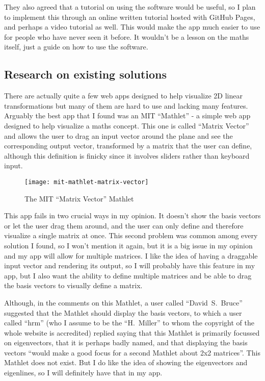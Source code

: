 \documentclass[../main.tex]{subfiles}
\begin{document}
They also agreed that a tutorial on using the software would be useful, so I plan to implement this through an online written tutorial hosted with GitHub Pages, and perhaps a video tutorial as well. This would make the app much easier to use for people who have never seen it before. It wouldn't be a lesson on the maths itself, just a guide on how to use the software.

\subsection{Research on existing solutions}

There are actually quite a few web apps designed to help visualize 2D linear transformations but many of them are hard to use and lacking many features. Arguably the best app that I found was an MIT \enquote{Mathlet} - a simple web app designed to help visualize a maths concept. This one is called \enquote{Matrix Vector}\cite{mit-mathlet-matrix-vector} and allows the user to drag an input vector around the plane and see the corresponding output vector, transformed by a matrix that the user can define, although this definition is finicky since it involves sliders rather than keyboard input.

\begin{figure}[h]
	\centering
	\texttt{[image: mit-mathlet-matrix-vector]}
	\caption{The MIT \enquote{Matrix Vector} Mathlet}
	\label{fig:mit-mathlet-matrix-vector}
\end{figure}

This app fails in two crucial ways in my opinion. It doesn't show the basis vectors or let the user drag them around, and the user can only define and therefore visualize a single matrix at once. This second problem was common among every solution I found, so I won't mention it again, but it is a big issue in my opinion and my app will allow for multiple matrices. I like the idea of having a draggable input vector and rendering its output, so I will probably have this feature in my app, but I also want the ability to define multiple matrices and be able to drag the basis vectors to visually define a matrix.

Although, in the comments on this Mathlet, a user called \enquote{David~S.~Bruce} suggested that the Mathlet should display the basis vectors, to which a user called \enquote{hrm} (who I assume to be the \enquote{H.~Miller} to whom the copyright of the whole website is accredited) replied saying that this Mathlet is primarily focussed on eigenvectors, that it is perhaps badly named, and that displaying the basis vectors \enquote{would make a good focus for a second Mathlet about 2x2 matrices}. This Mathlet does not exist. But I do like the idea of showing the eigenvectors and eigenlines, so I will definitely have that in my app.
\end{document}
